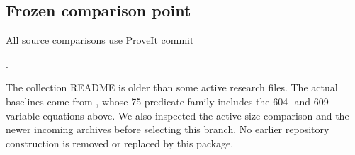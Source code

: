 \subsection{Frozen comparison point}

All source comparisons use ProveIt commit
\begin{center}\small\pin.\end{center}
The collection README is older than some active research files. The actual baselines come from , whose 75-predicate family includes the 604- and 609-variable equations above. We also inspected the active size comparison and the newer incoming archives before selecting this branch. No earlier repository construction is removed or replaced by this package.
